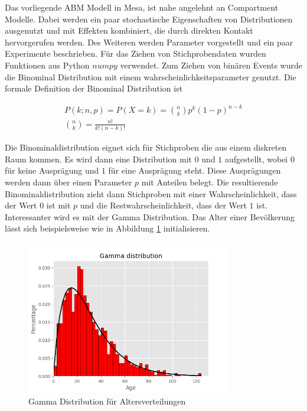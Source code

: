 \documentclass[paper=a4, fontsize=11pt, ngerman, abstract=on]{scrartcl}
\numberwithin{equation}{section} %
\numberwithin{figure}{section} %
\numberwithin{table}{section} %
\begin{document}
Das vorliegende ABM Modell in Mesa, ist nahe angelehnt an Compartment Modelle. Dabei werden ein paar stochastische Eigenschaften von Distributionen ausgenutzt und mit Effekten kombiniert, die durch direkten Kontakt hervorgerufen werden. Des Weiteren werden Parameter vorgestellt und ein paar Experimente beschrieben. Für das Ziehen von Stichprobendaten wurden Funktionen aus Python $numpy$ verwendet. Zum Ziehen von binären Events wurde die Binominal Distribution mit einem wahrscheinlichkeitsparameter genutzt. Die formale Definition der Binominal Distribution ist

\begin{gather*}
P(k; n, p) = P(X = k) = \binom{n}{k}p^{k}(1 - p)^{n - k} \\
\binom{n}{k} = \frac{n!}{k!(n-k)!}
\end{gather*}

Die Binominaldistribution eignet sich für Stichproben die aus einem diskreten Raum kommen. Es wird dann eine Distribution mit $0$ und $1$ aufgestellt, wobei $0$ für keine Ausprägung und $1$ für eine Ausprägung steht. Diese Ausprägungen werden dann über einen Parameter $p$ mit Anteilen belegt. Die resultierende Binominaldistribution zieht dann Stichproben mit einer Wahrscheinlichkeit, dass der Wert $0$ ist mit $p$ und die Restwahrscheinlichkeit, dass der Wert $1$ ist. Interessanter wird es mit der Gamma Distribution. Das Alter einer Bevölkerung lässt sich beispielsweise wie in Abbildung \ref{fig:gamma-age-dist} initialisieren.

\begin{figure}[ht]
  \centering
  \includegraphics[width=0.8\textwidth,keepaspectratio]{images/gamma-age-dist}
  \caption{Gamma Distribution für Altersverteilungen}
  \label{fig:gamma-age-dist}
\end{figure}
\end{document}
